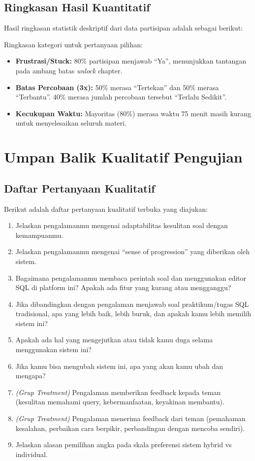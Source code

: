 \subsection{Ringkasan Hasil Kuantitatif}
Hasil ringkasan statistik deskriptif dari data partisipan adalah sebagai berikut:



Ringkasan kategori untuk pertanyaan pilihan:
\begin{itemize}
    \item \textbf{Frustrasi/Stuck:} 80\% partisipan menjawab ``Ya'', menunjukkan tantangan pada ambang batas \textit{unlock} chapter.
    \item \textbf{Batas Percobaan (3x):} 50\% merasa ``Tertekan'' dan 50\% merasa ``Terbantu''. 40\% merasa jumlah percobaan tersebut ``Terlalu Sedikit''.
    \item \textbf{Kecukupan Waktu:} Mayoritas (80\%) merasa waktu 75 menit masih kurang untuk menyelesaikan seluruh materi.
\end{itemize}

\section{Umpan Balik Kualitatif Pengujian}

\subsection{Daftar Pertanyaan Kualitatif}
Berikut adalah daftar pertanyaan kualitatif terbuka yang diajukan:
\begin{enumerate}[1.]
    \item Jelaskan pengalamanmu mengenai adaptabilitas kesulitan soal dengan kemampuanmu.
    \item Jelaskan pengalamanmu mengenai ``sense of progression'' yang diberikan oleh sistem.
    \item Bagaimana pengalamanmu membaca perintah soal dan menggunakan editor SQL di platform ini? Apakah ada fitur yang kurang atau mengganggu?
    \item Jika dibandingkan dengan pengalaman menjawab soal praktikum/tugas SQL tradisional, apa yang lebih baik, lebih buruk, dan apakah kamu lebih memilih sistem ini?
    \item Apakah ada hal yang mengejutkan atau tidak kamu duga selama menggunakan sistem ini?
    \item Jika kamu bisa mengubah sistem ini, apa yang akan kamu ubah dan mengapa?
    \item \textit{(Grup Treatment)} Pengalaman memberikan feedback kepada teman (kesulitan memahami query, kebermanfaatan, keyakinan membantu).
    \item \textit{(Grup Treatment)} Pengalaman menerima feedback dari teman (pemahaman kesalahan, perbaikan cara berpikir, perbandingan dengan mencoba sendiri).
    \item Jelaskan alasan pemilihan angka pada skala preferensi sistem hybrid vs individual.
\end{enumerate}


